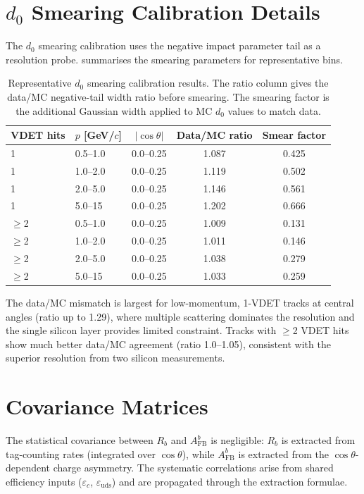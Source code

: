 \documentclass[11pt,a4paper]{article}
\begin{document}
\section{$d_0$ Smearing Calibration Details}
\label{app:d0_smearing}

The $d_0$ smearing calibration uses the negative impact parameter
tail as a resolution probe.
 summarises the smearing parameters
for representative bins.

\begin{table}[htbp]
\centering
\caption{Representative $d_0$ smearing calibration results.
The ratio column gives the data/MC negative-tail width ratio
before smearing. The smearing factor is the additional Gaussian
width applied to MC $d_0$ values to match data.}
\label{tbl:d0_smearing_summary}
\begin{tabular}{llccc}
\toprule
VDET hits & $p$ [GeV/$c$] & $|\cos\theta|$ &
Data/MC ratio & Smear factor \\
\midrule
1 & 0.5--1.0 & 0.0--0.25 & 1.087 & 0.425 \\
1 & 1.0--2.0 & 0.0--0.25 & 1.119 & 0.502 \\
1 & 2.0--5.0 & 0.0--0.25 & 1.146 & 0.561 \\
1 & 5.0--15  & 0.0--0.25 & 1.202 & 0.666 \\
$\geq$2 & 0.5--1.0 & 0.0--0.25 & 1.009 & 0.131 \\
$\geq$2 & 1.0--2.0 & 0.0--0.25 & 1.011 & 0.146 \\
$\geq$2 & 2.0--5.0 & 0.0--0.25 & 1.038 & 0.279 \\
$\geq$2 & 5.0--15  & 0.0--0.25 & 1.033 & 0.259 \\
\bottomrule
\end{tabular}
\end{table}

The data/MC mismatch is largest for low-momentum, 1-VDET tracks at
central angles (ratio up to 1.29), where multiple scattering
dominates the resolution and the single silicon layer provides
limited constraint.
Tracks with $\geq$2 VDET hits show much better data/MC agreement
(ratio 1.0--1.05), consistent with the superior resolution from
two silicon measurements.

\section{Covariance Matrices}
\label{app:covariance}

The statistical covariance between $R_b$ and $A_\text{FB}^b$ is
negligible: $R_b$ is extracted from tag-counting rates (integrated
over $\cos\theta$), while $A_\text{FB}^b$ is extracted from the
$\cos\theta$-dependent charge asymmetry.
The systematic correlations arise from shared efficiency inputs
($\varepsilon_c$, $\varepsilon_\text{uds}$) and are propagated
through the extraction formulae.
\end{document}
